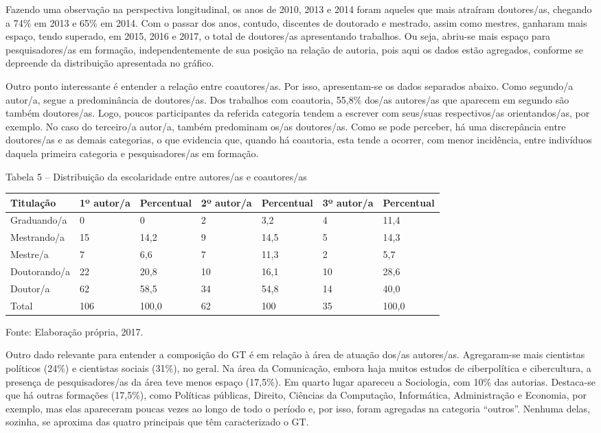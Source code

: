 Fazendo uma observação na perspectiva longitudinal, os anos de 2010,
2013 e 2014 foram aqueles que mais atraíram doutores/as, chegando a 74\%
em 2013 e 65\% em 2014. Com o passar dos anos, contudo, discentes de
doutorado e mestrado, assim como mestres, ganharam mais espaço, tendo
superado, em 2015, 2016 e 2017, o total de doutores/as apresentando
trabalhos. Ou seja, abriu-se mais espaço para pesquisadores/as em
formação, independentemente de sua posição na relação de autoria, pois
aqui os dados estão agregados, conforme se depreende da distribuição
apresentada no gráfico.

Outro ponto interessante é entender a relação entre coautores/as. Por
isso, apresentam-se os dados separados abaixo. Como segundo/a autor/a,
segue a predominância de doutores/as. Dos trabalhos com coautoria,
55,8\% dos/as autores/as que aparecem em segundo são também doutores/as.
Logo, poucos participantes da referida categoria tendem a escrever com
seus/suas respectivos/as orientandos/as, por exemplo. No caso do
terceiro/a autor/a, também predominam os/as doutores/as. Como se pode
perceber, há uma discrepância entre doutores/as e as demais categorias,
o que evidencia que, quando há coautoria, esta tende a ocorrer, com
menor incidência, entre indivíduos daquela primeira categoria e
pesquisadores/as em formação.

Tabela 5 -- Distribuição da escolaridade entre autores/as e coautores/as

\begin{longtable}[]{@{}lllllll@{}}
\toprule
Titulação & 1º autor/a & Percentual & 2º autor/a & Percentual & 3º
autor/a & Percentual\tabularnewline
\midrule
\endhead
Graduando/a & 0 & 0 & 2 & 3,2 & 4 & 11,4\tabularnewline
Mestrando/a & 15 & 14,2 & 9 & 14,5 & 5 & 14,3\tabularnewline
Mestre/a & 7 & 6,6 & 7 & 11,3 & 2 & 5,7\tabularnewline
Doutorando/a & 22 & 20,8 & 10 & 16,1 & 10 & 28,6\tabularnewline
Doutor/a & 62 & 58,5 & 34 & 54,8 & 14 & 40,0\tabularnewline
Total & 106 & 100,0 & 62 & 100 & 35 & 100,0\tabularnewline
\bottomrule
\end{longtable}

Fonte: Elaboração própria, 2017.

Outro dado relevante para entender a composição do GT é em relação à
área de atuação dos/as autores/as. Agregaram-se mais cientistas
políticos (24\%) e cientistas sociais (31\%), no geral. Na área da
Comunicação, embora haja muitos estudos de ciberpolítica e cibercultura,
a presença de pesquisadores/as da área teve menos espaço (17,5\%). Em
quarto lugar apareceu a Sociologia, com 10\% das autorias. Destaca-se
que há outras formações (17,5\%), como Políticas públicas, Direito,
Ciências da Computação, Informática, Administração e Economia, por
exemplo, mas elas apareceram poucas vezes ao longo de todo o período e,
por isso, foram agregadas na categoria ``outros''. Nenhuma delas,
sozinha, se aproxima das quatro principais que têm caracterizado o GT.

